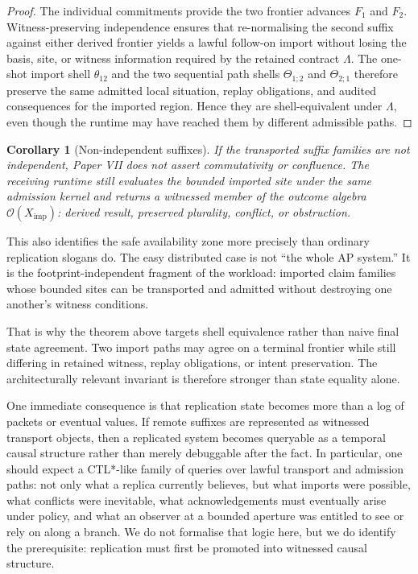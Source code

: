 \documentclass[11pt]{article}
\theoremstyle{definition}
\theoremstyle{plain}
\newtheorem{corollary}[definition]{Corollary}
\theoremstyle{remark}
\begin{document}
\begin{proof}
The individual commitments provide the two frontier advances \(F_1\) and \(F_2\).
Witness-preserving independence ensures that re-normalising the second suffix
against either derived frontier yields a lawful follow-on import without losing
the basis, site, or witness information required by the retained contract
\(\Lambda\). The one-shot import shell \(\theta_{12}\) and the two sequential
path shells \(\Theta_{1;2}\) and \(\Theta_{2;1}\) therefore preserve the same
admitted local situation, replay obligations, and audited consequences for the
imported region. Hence they are shell-equivalent under \(\Lambda\), even though
the runtime may have reached them by different admissible paths.
\end{proof}

\begin{corollary}[Non-independent suffixes]
If the transported suffix families are not independent, Paper VII does not
assert commutativity or confluence. The receiving runtime still evaluates the
bounded imported site under the same admission kernel and returns a witnessed
member of the outcome algebra
\(\mathcal{O}(X_{\mathrm{imp}})\): derived result, preserved plurality,
conflict, or obstruction.
\end{corollary}

This also identifies the safe availability zone more precisely than ordinary
replication slogans do. The easy distributed case is not ``the whole AP
system.'' It is the footprint-independent fragment of the workload: imported
claim families whose bounded sites can be transported and admitted without
destroying one another's witness conditions.

That is why the theorem above targets shell equivalence rather than naive final
state agreement. Two import paths may agree on a terminal frontier while still
differing in retained witness, replay obligations, or intent preservation. The
architecturally relevant invariant is therefore stronger than state equality
alone.

One immediate consequence is that replication state becomes more than a log of packets or eventual values. If remote suffixes are represented as witnessed transport objects, then a replicated system becomes queryable as a temporal causal structure rather than merely debuggable after the fact. In particular, one should expect a CTL*-like family of queries over lawful transport and admission paths: not only what a replica currently believes, but what imports were possible, what conflicts were inevitable, what acknowledgements must eventually arise under policy, and what an observer at a bounded aperture was entitled to see or rely on along a branch. We do not formalise that logic here, but we do identify the prerequisite: replication must first be promoted into witnessed causal structure.
\end{document}
